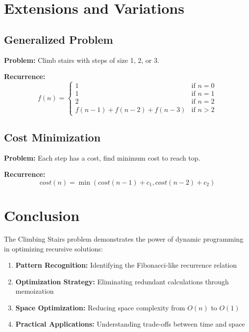 \documentclass[12pt,a4paper]{article}
\begin{document}
\section{Extensions and Variations}

\subsection{Generalized Problem}
\textbf{Problem:} Climb stairs with steps of size 1, 2, or 3.

\textbf{Recurrence:}
\begin{equation}
f(n) = \begin{cases}
1 & \text{if } n = 0 \\
1 & \text{if } n = 1 \\
2 & \text{if } n = 2 \\
f(n-1) + f(n-2) + f(n-3) & \text{if } n > 2
\end{cases}
\end{equation}

\subsection{Cost Minimization}
\textbf{Problem:} Each step has a cost, find minimum cost to reach top.

\textbf{Recurrence:}
\begin{equation}
cost(n) = \min(cost(n-1) + c_1, cost(n-2) + c_2)
\end{equation}

\section{Conclusion}

The Climbing Stairs problem demonstrates the power of dynamic programming in optimizing recursive solutions:

\begin{enumerate}
\item \textbf{Pattern Recognition:} Identifying the Fibonacci-like recurrence relation
\item \textbf{Optimization Strategy:} Eliminating redundant calculations through memoization
\item \textbf{Space Optimization:} Reducing space complexity from $O(n)$ to $O(1)$
\item \textbf{Practical Applications:} Understanding trade-offs between time and space
\end{enumerate}
\end{document}
